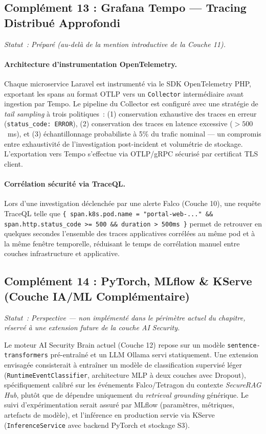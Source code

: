\subsection{Complément 13 : Grafana Tempo — Tracing Distribué Approfondi}
\label{subsec:comp_tempo_approfondi}
\textit{Statut~: Préparé (au-delà de la mention introductive de la Couche 11).}

\paragraph{Architecture d'instrumentation OpenTelemetry.}
Chaque microservice Laravel est instrumenté via le SDK OpenTelemetry PHP, exportant les spans au format OTLP vers un \texttt{Collector} intermédiaire avant ingestion par Tempo. Le pipeline du Collector est configuré avec une stratégie de \textit{tail sampling} à trois politiques~: (1) conservation exhaustive des traces en erreur (\texttt{status\_code: ERROR}), (2) conservation des traces en latence excessive ($> 500$~ms), et (3) échantillonnage probabiliste à 5\% du trafic nominal — un compromis entre exhaustivité de l'investigation post-incident et volumétrie de stockage. L'exportation vers Tempo s'effectue via OTLP/gRPC sécurisé par certificat TLS client.

\paragraph{Corrélation sécurité via TraceQL.}
Lors d'une investigation déclenchée par une alerte Falco (Couche 10), une requête TraceQL telle que \texttt{\{ span.k8s.pod.name = "portal-web-..." \&\& span.http.status\_code >= 500 \&\& duration > 500ms \}} permet de retrouver en quelques secondes l'ensemble des traces applicatives corrélées au même pod et à la même fenêtre temporelle, réduisant le temps de corrélation manuel entre couches infrastructure et applicative.


\subsection{Complément 14 : PyTorch, MLflow \& KServe (Couche IA/ML Complémentaire)}
\label{subsec:comp_pytorch_mlflow_kserve}
\textit{Statut~: Perspective — non implémenté dans le périmètre actuel du chapitre, réservé à une extension future de la couche AI Security.}

Le moteur AI Security Brain actuel (Couche 12) repose sur un modèle \texttt{sentence-transformers} pré-entraîné et un LLM Ollama servi statiquement. Une extension envisagée consisterait à entraîner un modèle de classification supervisé léger (\texttt{RuntimeEventClassifier}, architecture MLP à deux couches avec Dropout), spécifiquement calibré sur les événements Falco/Tetragon du contexte \textit{SecureRAG Hub}, plutôt que de dépendre uniquement du \textit{retrieval grounding} générique. Le suivi d'expérimentation serait assuré par MLflow (paramètres, métriques, artefacts de modèle), et l'inférence en production servie via KServe (\texttt{InferenceService} avec backend PyTorch et stockage S3).

